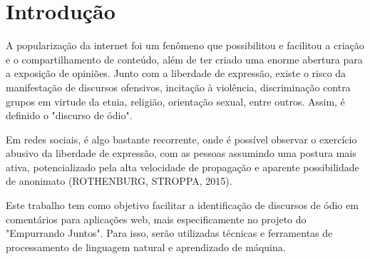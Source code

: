 \chapter*[Introdução]{Introdução}

A popularização da internet foi um fenômeno que possibilitou e facilitou a criação e o compartilhamento de conteúdo, além de ter criado uma enorme abertura para a exposição de opiniões. Junto com a liberdade de expressão, existe o risco da manifestação de discursos ofensivos, incitação à violência, discriminação contra grupos em virtude da etnia, religião, orientação sexual, entre outros. Assim, é definido o "discurso de ódio".

Em redes sociais, é algo bastante recorrente, onde é possível observar o exercício abusivo da liberdade de expressão, com as pessoas assumindo uma postura mais ativa, potencializado pela alta velocidade de propagação e aparente possibilidade de anonimato (ROTHENBURG, STROPPA, 2015).

\begin{comment}
## TODO Formatar a referência acima http://coral.ufsm.br/congressodireito/anais/2015/6-21.pdf
\end{comment}

Este trabalho tem como objetivo facilitar a identificação de discursos de ódio em comentários para aplicações web, mais especificamente no projeto do "Empurrando Juntos". Para isso, serão utilizadas técnicas e ferramentas de processamento de linguagem natural e aprendizado de máquina.
